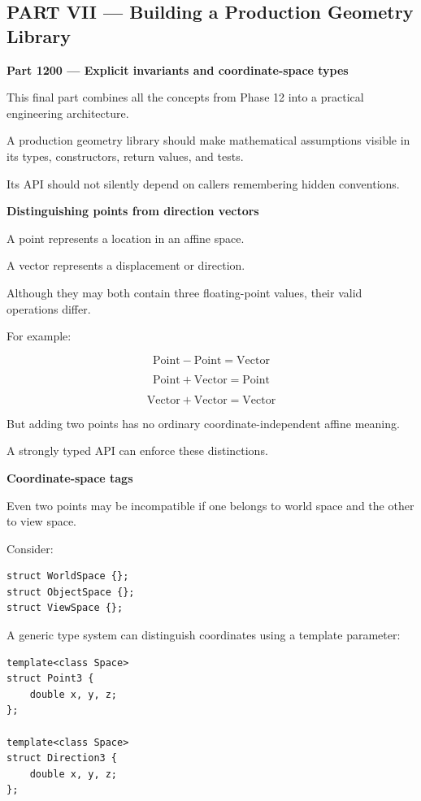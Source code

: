 \subsection{PART VII --- Building a Production Geometry Library}\label{04-visual-computing-ii-ch023-part-vii-building-a-production-geometry-library}

\textbf{Part 1200 --- Explicit invariants and coordinate-space types}

This final part combines all the concepts from Phase 12 into a practical engineering architecture.

A production geometry library should make mathematical assumptions visible in its types, constructors, return values, and tests.

Its API should not silently depend on callers remembering hidden conventions.

\textbf{Distinguishing points from direction vectors}

A point represents a location in an affine space.

A vector represents a displacement or direction.

Although they may both contain three floating-point values, their valid operations differ.

For example:

\[
\text{Point}-\text{Point}=\text{Vector}
\]

\[
\text{Point}+\text{Vector}=\text{Point}
\]

\[
\text{Vector}+\text{Vector}=\text{Vector}
\]

But adding two points has no ordinary coordinate-independent affine meaning.

A strongly typed API can enforce these distinctions.

\textbf{Coordinate-space tags}

Even two points may be incompatible if one belongs to world space and the other to view space.

Consider:

\begin{verbatim}
struct WorldSpace {};
struct ObjectSpace {};
struct ViewSpace {};
\end{verbatim}

A generic type system can distinguish coordinates using a template parameter:

\begin{verbatim}
template<class Space>
struct Point3 {
    double x, y, z;
};

template<class Space>
struct Direction3 {
    double x, y, z;
};
\end{verbatim}

